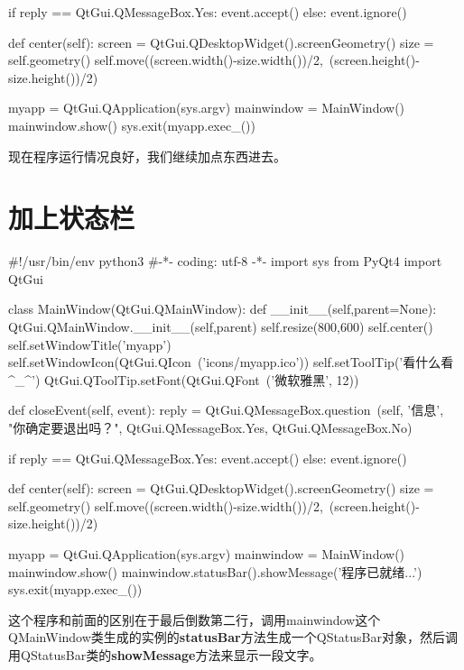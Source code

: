 \documentclass[12pt,oneside]{book}
\begin{document}
\begin{common-format}
\begin{tcbpython}
        if reply == QtGui.QMessageBox.Yes:
            event.accept()
        else:
            event.ignore()

    def center(self):
        screen = QtGui.QDesktopWidget().screenGeometry()
        size =  self.geometry()
        self.move((screen.width()-size.width())/2,\
         (screen.height()-size.height())/2)

myapp = QtGui.QApplication(sys.argv)
mainwindow = MainWindow()
mainwindow.show()
sys.exit(myapp.exec_())
\end{tcbpython}



现在程序运行情况良好，我们继续加点东西进去。


\section{加上状态栏}

\begin{tcbpython}[]
#!/usr/bin/env python3
#-*- coding: utf-8 -*-
import sys
from PyQt4  import QtGui

class MainWindow(QtGui.QMainWindow):
    def __init__(self,parent=None):
        QtGui.QMainWindow.__init__(self,parent)
        self.resize(800,600)
        self.center()
        self.setWindowTitle('myapp')
        self.setWindowIcon(QtGui.QIcon\
        ('icons/myapp.ico'))
        self.setToolTip('看什么看^_^')
        QtGui.QToolTip.setFont(QtGui.QFont\
        ('微软雅黑', 12))


    def closeEvent(self, event):
        reply = QtGui.QMessageBox.question\
        (self, '信息',
            "你确定要退出吗？",
             QtGui.QMessageBox.Yes,
             QtGui.QMessageBox.No)

        if reply == QtGui.QMessageBox.Yes:
            event.accept()
        else:
            event.ignore()

    def center(self):
        screen = QtGui.QDesktopWidget().screenGeometry()
        size =  self.geometry()
        self.move((screen.width()-size.width())/2,\
         (screen.height()-size.height())/2)

myapp = QtGui.QApplication(sys.argv)
mainwindow = MainWindow()
mainwindow.show()
mainwindow.statusBar().showMessage('程序已就绪...')
sys.exit(myapp.exec_())
\end{tcbpython}



这个程序和前面的区别在于最后倒数第二行，调用mainwindow这个QMainWindow类生成的实例的\textbf{statusBar}方法生成一个QStatusBar对象，然后调用QStatusBar类的\textbf{showMessage}方法来显示一段文字。


\end{common-format}
\end{document}
